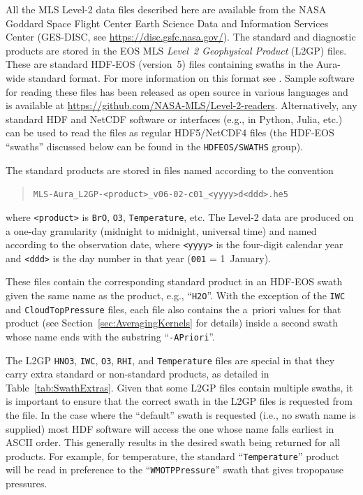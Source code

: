 All the MLS \mbox{Level-2} data files described here are available from the NASA Goddard Space Flight Center Earth Science Data and Information Services Center (GES-DISC, see \url{https://disc.gsfc.nasa.gov/}). The standard and diagnostic products are stored in the EOS MLS \emph{Level~2 Geophysical Product} (L2GP) files. These are standard HDF-EOS (version~5) files containing swaths in the Aura-wide standard format. For more information on this format see \citet{AuraFileConventions}. Sample software for reading these files has been released as open source in various languages and is available at \url{https://github.com/NASA-MLS/Level-2-readers}. Alternatively, any standard HDF and NetCDF software or interfaces (e.g., in Python, Julia, etc.) can be used to read the files as regular HDF5/NetCDF4 files (the HDF-EOS ``swaths'' discussed below can be found in the \texttt{HDFEOS/SWATHS} group).

The standard products are stored in files named according to the convention
\begin{quote}
  \verb+MLS-Aura_L2GP-<product>_v06-02-c01_<yyyy>d<ddd>.he5+
\end{quote}
where \verb+<product>+ is \texttt{BrO}, \texttt{O3}, \texttt{Temperature}, etc.  The \mbox{Level-2} data are produced on a one-day granularity (midnight to midnight, universal time) and named according to the observation date, where \verb+<yyyy>+ is the four-digit calendar year and \verb+<ddd>+ is the day number in that year (\texttt{001} = 1~January).

These files contain the corresponding standard product in an HDF-EOS swath given the same name as the product, e.g., ``\texttt{H2O}''. With the exception of the \texttt{IWC} and \texttt{CloudTopPressure} files, each file also contains the a~priori values for that product (see Section~\ref{sec:AveragingKernels} for details) inside a second swath whose name ends with the substring ``\texttt{-APriori}''.

The L2GP \texttt{HNO3}, \texttt{IWC}, \texttt{O3}, \texttt{RHI}, and \texttt{Temperature} files are special in that they carry extra standard or non-standard products, as detailed in Table~\ref{tab:SwathExtras}. Given that some L2GP files contain multiple swaths, it is important to ensure that the correct swath in the L2GP files is requested from the file. In the case where the ``default'' swath is requested (i.e., no swath name is supplied) most HDF software will access the one whose name falls earliest in ASCII order. This generally results in the desired swath being returned for all products. For example, for temperature, the standard ``\texttt{Temperature}'' product will be read in preference to the ``\texttt{WMOTPPressure}'' swath that gives tropopause pressures.

